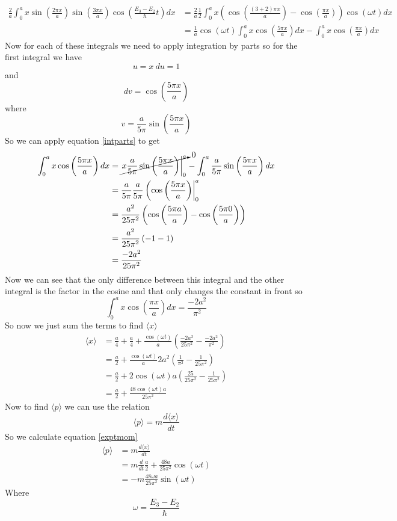 \documentclass[11pt]{article}
\numberwithin{equation}{section}
\newcommand{\expt}[1]{\langle{#1}\rangle}
\begin{document}
\begin{enumerate}[(a)]
\begin{align*}
\frac{2}{a}\int_0^a x\sin\left(\frac{2\pi x}{a}\right)\sin\left(\frac{3\pi x}{a}\right)\cos\left(\frac{E_3-E_2}{\hbar}t\right)dx &= \frac{2}{a}\frac{1}{2}\int_0^a x\left(\cos\left(\frac{(3+2)\pi x}{a}\right) - \cos\left(\frac{\pi x}{a}\right)\right)\cos\left(\omega t\right)dx\\
&= \frac{1}{a}\cos\left(\omega t\right)\int_0^a x\cos\left(\frac{5\pi x}{a}\right)dx - \int_0^ax\cos\left(\frac{\pi x}{a}\right)dx
\end{align*}
Now for each of these integrals we need to apply integration by parts so for the first integral we have
$$u = x\ du = 1$$
and
$$dv = \cos\left(\frac{5\pi x}{a}\right)$$
where 
$$v = \frac{a}{5\pi}\sin\left(\frac{5\pi x}{a}\right)$$
So we can apply equation \ref{intparts} to get
\begin{align*}
\int_0^a x\cos\left(\frac{5\pi x}{a}\right)dx &= \cancelto{0}{\left.x\frac{a}{5\pi}\sin\left(\frac{5\pi x}{a}\right)\right|_0^a} - \int_0^a\frac{a}{5\pi}\sin\left(\frac{5\pi x}{a}\right)dx\\
&= \frac{a}{5\pi}\frac{a}{5\pi}\left(\cos\left(\frac{5\pi x}{a}\right)\right|_0^a\\
&= \frac{a^2}{25\pi^2}\left(\cos\left(\frac{5\pi a}{a}\right) - \cos\left(\frac{5\pi 0}{a}\right)\right)\\
&= \frac{a^2}{25\pi^2}\left(-1 - 1\right)\\
&= \frac{-2a^2}{25\pi^2}
\end{align*}
Now we can see that the only difference between this integral and the other integral is the factor in the cosine and that only changes the constant in front so
$$\int_0^ax\cos\left(\frac{\pi x}{a}\right)dx = \frac{-2a^2}{\pi^2}$$
So now we just sum the terms to find $\expt{x}$
\begin{align*}
\expt{x} &= \frac{a}{4}+\frac{a}{4}+\frac{\cos(\omega t)}{a}\left(\frac{-2a^2}{25\pi^2} - \frac{-2a^2}{\pi^2}\right)\\
&= \frac{a}{2}+\frac{\cos(\omega t)}{a}2a^2\left(\frac{1}{\pi^2} - \frac{1}{25\pi^2}\right)\\
&= \frac{a}{2}+2\cos(\omega t)a\left(\frac{25}{25\pi^2} - \frac{1}{25\pi^2}\right)\\
&= \frac{a}{2}+\frac{48\cos(\omega t) a}{25\pi^2}
\end{align*}
Now to find $\expt{p}$ we can use the relation
\begin{equation}
\expt{p} = m\frac{d\expt{x}}{dt}
\label{exptmom}
\end{equation}
So we calculate equation \ref{exptmom}
\begin{align*}
\expt{p} &= m\frac{d\expt{x}}{dt}\\
&= m\frac{d}{dt}\frac{a}{2}+\frac{48 a}{25\pi^2}\cos(\omega t)\\
&= -m\frac{48\omega a}{25\pi^2}\sin(\omega t)
\end{align*}
Where 
$$\omega = \frac{E_3-E_2}{\hbar}$$


\end{enumerate}
\end{document}
